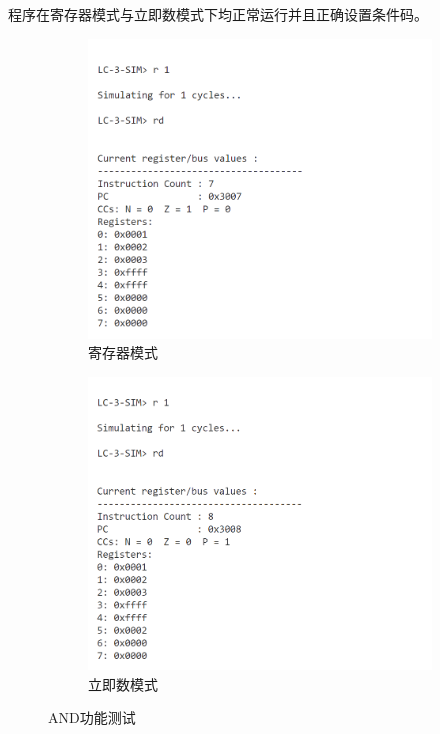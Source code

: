 \documentclass[UTF8]{ctexart}
\begin{document}
程序在寄存器模式与立即数模式下均正常运行并且正确设置条件码。
\begin{figure}[htbp]
  \centering
  \begin{subfigure}{0.48\textwidth} %
    \includegraphics[width=\linewidth]{and1.png}
    \caption{寄存器模式}
  \end{subfigure}
  \hfill
  \begin{subfigure}{0.48\textwidth}
    \includegraphics[width=\linewidth]{and2.png}
    \caption{立即数模式}
  \end{subfigure}
  \caption{AND功能测试}
  \label{and}
\end{figure}
\end{document}
